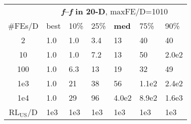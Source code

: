 \begin{tabular}{c|llllll}
 & \multicolumn{6}{|c}{\textbf{\textit{f}\raisebox{-0.35ex}{1}--\textit{f}\raisebox{-0.35ex}{24} in 20-D}, maxFE/D=1010}\\
\#FEs/D & best & 10\% & 25\% & \textbf{med} & 75\% & 90\%\\
2 & \hspace*{1ex}1.0 & \hspace*{1ex}1.0 & \hspace*{1ex}3.4 & 13 & 40 & 40\\
10 & \hspace*{1ex}1.0 & \hspace*{1ex}1.0 & \hspace*{1ex}7.2 & 13 & 50 & 2.0e2\\
100 & \hspace*{1ex}1.0 & \hspace*{1ex}6.3 & 13 & 19 & 32 & 49\\
1e3 & \hspace*{1ex}1.0 & 21 & 38 & 56 & 1.1e2 & 2.4e2\\
1e4 & \hspace*{1ex}1.0 & 29 & 96 & 4.0e2 & 8.9e2 & 1.6e3\\
$\text{RL}_{\text{US}}$/D & 1e3 & 1e3 & 1e3 & 1e3 & 1e3 & 1e3
\end{tabular}
